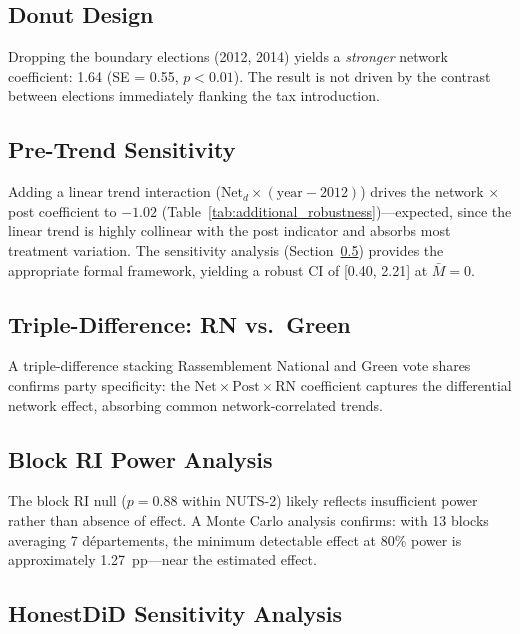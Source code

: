 \documentclass[12pt]{article}
\newcommand{\rn}{Rassemblement National}
\newcommand{\depts}{d\'{e}partements}
\begin{document}
\subsection{Donut Design}

Dropping the boundary elections (2012, 2014) yields a \emph{stronger} network coefficient: 1.64 (SE = 0.55, $p < 0.01$). The result is not driven by the contrast between elections immediately flanking the tax introduction.

\subsection{Pre-Trend Sensitivity}

Adding a linear trend interaction ($\text{Net}_d \times (\text{year} - 2012)$) drives the network $\times$ post coefficient to $-1.02$ (Table~\ref{tab:additional_robustness})---expected, since the linear trend is highly collinear with the post indicator and absorbs most treatment variation. The \citet{rambachan2023more} sensitivity analysis (Section~\ref{sec:honestdid}) provides the appropriate formal framework, yielding a robust CI of [0.40, 2.21] at $\bar{M} = 0$.

\subsection{Triple-Difference: RN vs.\ Green}

A triple-difference stacking \rn{} and Green vote shares confirms party specificity: the $\text{Net} \times \text{Post} \times \text{RN}$ coefficient captures the differential network effect, absorbing common network-correlated trends.

\subsection{Block RI Power Analysis}
\label{sec:block_power}

The block RI null ($p = 0.88$ within NUTS-2) likely reflects insufficient power rather than absence of effect. A Monte Carlo analysis confirms: with 13 blocks averaging 7 \depts{}, the minimum detectable effect at 80\% power is approximately 1.27~pp---near the estimated effect.

\subsection{HonestDiD Sensitivity Analysis}
\label{sec:honestdid}
\end{document}
